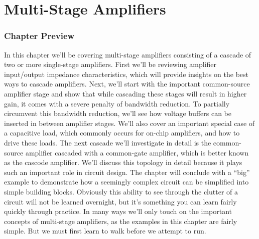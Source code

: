 \chapter{Multi-Stage Amplifiers}




\graphicspath{{./figs_multistage/}}

\newcommand{\topicA}{Review Amplifier Input/Output Impedance Characteristics}
\newcommand{\topicB}{Common-Source Cascades}
\newcommand{\topicC}{Common-Source with Capacitive Load}
\newcommand{\topicD}{Common-Source Common-Gate Cascade (Cascode)}
\newcommand{\topicE}{``Big Circuit" Example}


\subsection{Chapter Preview}



In this chapter we'll be covering multi-stage amplifiers consisting of a cascade of two or more single-stage amplifiers.  First we'll be reviewing amplifier input/output impedance characteristics, which will provide insights on the best ways to cascade amplifiers.  Next, we'll start with the important common-source amplifier stage and show that while cascading these stages will result in higher gain, it comes with a severe penalty of bandwidth reduction.  To partially circumvent this bandwidth reduction, we'll see how voltage buffers can be inserted in between amplifier stages.  We'll also cover an important special case of a capacitive load, which commonly occurs for on-chip amplifiers, and how to drive these loads.  The next cascade we'll investigate in detail is the common-source amplifier cascaded with a common-gate amplifier, which is better known as the cascode amplifier.  We'll discuss this topology in detail because it plays such an important role in circuit design.  The chapter will conclude with a ``big'' example to demonstrate how a seemingly complex circuit can be simplified into simple building blocks.  Obviously this ability to see through the clutter of a circuit will not be learned overnight, but it's something you can learn fairly quickly through practice.  In many ways we'll only touch on the important concepts of multi-stage amplifiers, as the examples in this chapter are fairly simple.  But we must first learn to walk before we attempt to run.



